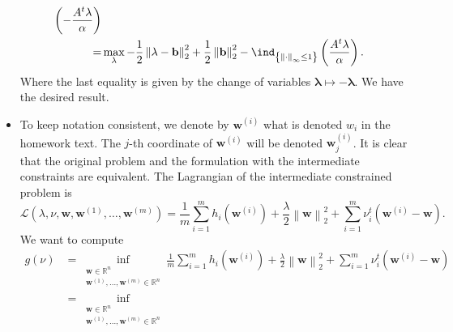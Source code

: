 \documentclass{article}
\begin{document}
\begin{itemize}
\begin{align*}
               \left(-\frac{A^{t}\mathbf{\lambda}}{\alpha}\right)\\
               =& \max_{\mathbf{\lambda}} -\frac{1}{2}\left\|\mathbf{\lambda}-\mathbf{b}\right\|_{2}^{2}
               +\frac{1}{2}\left\|\mathbf{b}\right\|_{2}^{2}
               -\ind_{\left\{\left\|\cdot\right\|_{\infty} \leq 1\right\}}
               \left(\frac{A^{t}\mathbf{\lambda}}{\alpha}\right).
           \end{align*}
           Where the last equality is given
           by the change of variables
           $\mathbf{\lambda} \mapsto - \mathbf{\lambda}$.
           We have the desired result.
       \item To keep notation consistent, we denote
           by $\mathbf{w}^{\left(i\right)}$ what is
           denoted $w_{i}$ in
           the homework text. The
           $j$-th coordinate of $\mathbf{w}^{\left(i\right)}$ 
           will be denoted $\mathbf{w}^{\left(i\right)}_{j}$.
           It is clear that the original problem and
           the formulation with
           the intermediate 
           constraints are equivalent.
           The Lagrangian of the
           intermediate
           constrained problem is
           \begin{equation*}
               \mathcal{L}\left(\lambda, \nu, \mathbf{w}, \mathbf{w}^{\left(1\right)}, 
               \ldots, \mathbf{w}^{\left(m\right)}\right) =
               \frac{1}{m} \sum_{i = 1}^{m} h_{i}\left(\mathbf{w}^{\left(i\right)}\right)
               + \frac{\lambda}{2} \left\|\mathbf{w}\right\|^{2}_{2}
               + \sum_{i = 1}^{m}\nu_{i}^{t}\left(\mathbf{w}^{\left(i\right)} - \mathbf{w}\right).
           \end{equation*}
           We want to compute
           \begin{align*}
               g\left(\nu\right) &=
               \inf_{\substack{
               \mathbf{w} \in \mathbb{R}^{n} \\
               \mathbf{w}^{\left(1\right)}, \ldots, \mathbf{w}^{\left(m\right)} \in \mathbb{R}^{n}      
               }}
               \frac{1}{m} \sum_{i = 1}^{m} h_{i}\left(\mathbf{w}^{\left(i\right)}\right)
               + \frac{\lambda}{2} \left\|\mathbf{w}\right\|^{2}_{2}
               + \sum_{i = 1}^{m} \nu_{i}^{t} \left(\mathbf{w}^{\left(i\right)} - \mathbf{w}\right) \\
               &= \inf_{\substack{
               \mathbf{w} \in \mathbb{R}^{n} \\
               \mathbf{w}^{\left(1\right)}, \ldots, \mathbf{w}^{\left(m\right)} \in \mathbb{R}^{n}      
}}
\end{align*}
\end{itemize}
\end{document}

